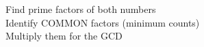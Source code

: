 \documentclass[preview]{standalone}
\begin{document}
Find prime factors of both numbers\\Identify COMMON factors (minimum counts)\\Multiply them for the GCD\\
\end{document}
